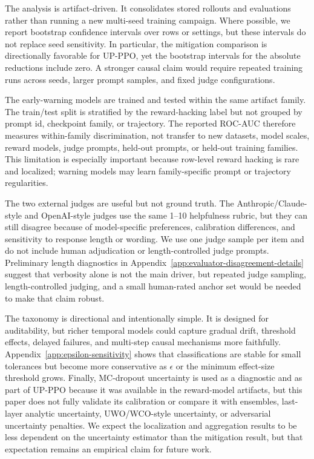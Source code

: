\documentclass[11pt]{article}
\begin{document}
The analysis is artifact-driven. It consolidates stored rollouts and evaluations rather than running a new multi-seed training campaign. Where possible, we report bootstrap confidence intervals over rows or settings, but these intervals do not replace seed sensitivity. In particular, the mitigation comparison is directionally favorable for UP-PPO, yet the bootstrap intervals for the absolute reductions include zero. A stronger causal claim would require repeated training runs across seeds, larger prompt samples, and fixed judge configurations.

The early-warning models are trained and tested within the same artifact family. The train/test split is stratified by the reward-hacking label but not grouped by prompt id, checkpoint family, or trajectory. The reported ROC-AUC therefore measures within-family discrimination, not transfer to new datasets, model scales, reward models, judge prompts, held-out prompts, or held-out training families. This limitation is especially important because row-level reward hacking is rare and localized; warning models may learn family-specific prompt or trajectory regularities.

The two external judges are useful but not ground truth. The Anthropic/Claude-style and OpenAI-style judges use the same 1--10 helpfulness rubric, but they can still disagree because of model-specific preferences, calibration differences, and sensitivity to response length or wording. We use one judge sample per item and do not include human adjudication or length-controlled judge prompts. Preliminary length diagnostics in Appendix~\ref{app:evaluator-disagreement-details} suggest that verbosity alone is not the main driver, but repeated judge sampling, length-controlled judging, and a small human-rated anchor set would be needed to make that claim robust.

The taxonomy is directional and intentionally simple. It is designed for auditability, but richer temporal models could capture gradual drift, threshold effects, delayed failures, and multi-step causal mechanisms more faithfully. Appendix~\ref{app:epsilon-sensitivity} shows that classifications are stable for small tolerances but become more conservative as $\epsilon$ or the minimum effect-size threshold grows. Finally, MC-dropout uncertainty is used as a diagnostic and as part of UP-PPO because it was available in the reward-model artifacts, but this paper does not fully validate its calibration or compare it with ensembles, last-layer analytic uncertainty, UWO/WCO-style uncertainty, or adversarial uncertainty penalties. We expect the localization and aggregation results to be less dependent on the uncertainty estimator than the mitigation result, but that expectation remains an empirical claim for future work.
\end{document}
